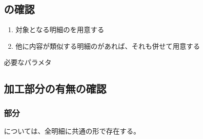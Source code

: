 \subsection{\nameDrawing の確認}
\begin{enumerate}[label=\sarrow]
\item 対象となる明細の\nameDrawing を用意する
\item 他に内容が類似する明細の\nameDrawing があれば、それも併せて用意する
\end{enumerate}
\begin{Parameter}{必要なパラメタ}
\PMDrawingExists%
\PMDrawingNumber%
\end{Parameter}


\subsection{加工部分の有無の確認}

\subsubsection{\EndFacecutMilling 部分}
\EndFacecutMilling については、全明細に共通の形で存在する。

